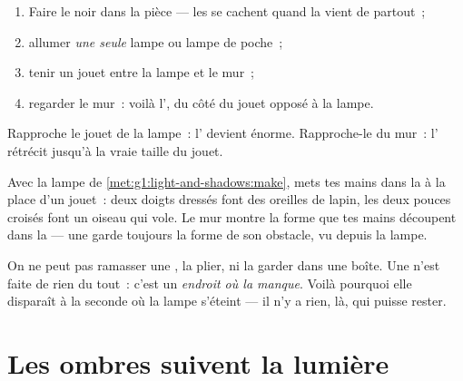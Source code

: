 \begin{method}\label{met:g1:light-and-shadows:make}
\begin{enumerate}
  \item Faire le noir dans la pièce --- les  se cachent quand
        la  vient de partout~;
  \item allumer \emph{une seule} lampe ou lampe de poche~;
  \item tenir un jouet entre la lampe et le mur~;
  \item regarder le mur~: voilà l', du côté du jouet opposé à la
        lampe.
\end{enumerate}
Rapproche le jouet de la lampe~: l' devient énorme.
Rapproche-le du mur~: l' rétrécit jusqu'à la vraie taille du
jouet.
\end{method}

\begin{example}\label{ex:g1:light-and-shadows:animals}
Avec la lampe de \cref{met:g1:light-and-shadows:make}, mets tes mains
dans la  à la place d'un jouet~: deux doigts dressés font des
oreilles de lapin, les deux pouces croisés font un oiseau qui vole.
Le mur montre la forme que tes mains découpent dans la  ---
une  garde toujours la forme de son obstacle, vu depuis la
lampe.
\end{example}

\begin{remark}\label{rem:g1:light-and-shadows:notathing}
On ne peut pas ramasser une , la plier, ni la garder dans une
boîte. Une  n'est faite de rien du tout~: c'est un \emph{endroit
où la  manque}. Voilà pourquoi elle disparaît à la seconde où
la lampe s'éteint --- il n'y a rien, là, qui puisse rester.
\end{remark}

\section{Les ombres suivent la lumière}

